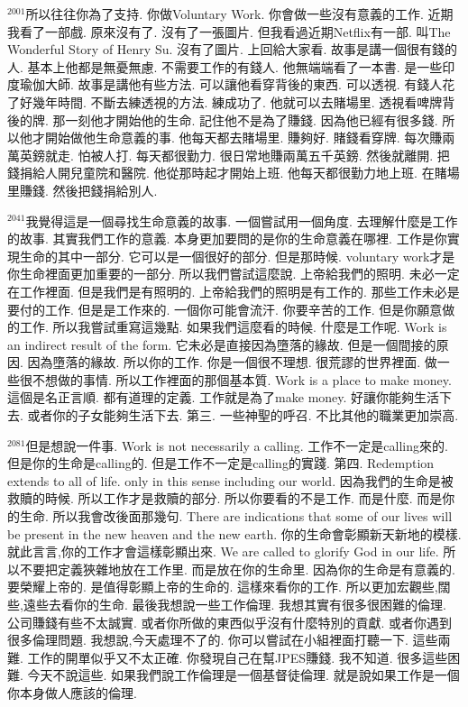 \documentclass{book}
\begin{document}
$^{2001}$所以往往你為了支持.
你做Voluntary Work.
你會做一些沒有意義的工作.
近期我看了一部戲.
原來沒有了.
沒有了一張圖片.
但我看過近期Netflix有一部.
叫The Wonderful Story of Henry Su.
沒有了圖片.
上回給大家看.
故事是講一個很有錢的人.
基本上他都是無憂無慮.
不需要工作的有錢人.
他無端端看了一本書.
是一些印度瑜伽大師.
故事是講他有些方法.
可以讓他看穿背後的東西.
可以透視.
有錢人花了好幾年時間.
不斷去練透視的方法.
練成功了.
他就可以去賭場里.
透視看啤牌背後的牌.
那一刻他才開始他的生命.
記住他不是為了賺錢.
因為他已經有很多錢.
所以他才開始做他生命意義的事.
他每天都去賭場里.
賺夠好.
賭錢看穿牌.
每次賺兩萬英鎊就走.
怕被人打.
每天都很勤力.
很日常地賺兩萬五千英鎊.
然後就離開.
把錢捐給人開兒童院和醫院.
他從那時起才開始上班.
他每天都很勤力地上班.
在賭場里賺錢.
然後把錢捐給別人.

$^{2041}$我覺得這是一個尋找生命意義的故事.
一個嘗試用一個角度.
去理解什麼是工作的故事.
其實我們工作的意義.
本身更加要問的是你的生命意義在哪裡.
工作是你實現生命的其中一部分.
它可以是一個很好的部分.
但是那時候.
voluntary work才是你生命裡面更加重要的一部分.
所以我們嘗試這麼說.
上帝給我們的照明.
未必一定在工作裡面.
但是我們是有照明的.
上帝給我們的照明是有工作的.
那些工作未必是要付的工作.
但是是工作來的.
一個你可能會流汗.
你要辛苦的工作.
但是你願意做的工作.
所以我嘗試重寫這幾點.
如果我們這麼看的時候.
什麼是工作呢.
Work is an indirect result of the form.
它未必是直接因為墮落的緣故.
但是一個間接的原因.
因為墮落的緣故.
所以你的工作.
你是一個很不理想.
很荒謬的世界裡面.
做一些很不想做的事情.
所以工作裡面的那個基本質.
Work is a place to make money.
這個是名正言順.
都有道理的定義.
工作就是為了make money.
好讓你能夠生活下去.
或者你的子女能夠生活下去.
第三.
一些神聖的呼召.
不比其他的職業更加崇高.

$^{2081}$但是想說一件事.
Work is not necessarily a calling.
工作不一定是calling來的.
但是你的生命是calling的.
但是工作不一定是calling的實踐.
第四.
Redemption extends to all of life.
only in this sense including our world.
因為我們的生命是被救贖的時候.
所以工作才是救贖的部分.
所以你要看的不是工作.
而是什麼.
而是你的生命.
所以我會改後面那幾句.
There are indications that some of our lives will be present in the new heaven and the new earth.
你的生命會彰顯新天新地的模樣.
就此言言,你的工作才會這樣彰顯出來.
We are called to glorify God in our life.
所以不要把定義狹雜地放在工作里.
而是放在你的生命里.
因為你的生命是有意義的.
要榮耀上帝的.
是值得彰顯上帝的生命的.
這樣來看你的工作.
所以更加宏觀些,闊些,遠些去看你的生命.
最後我想說一些工作倫理.
我想其實有很多很困難的倫理.
公司賺錢有些不太誠實.
或者你所做的東西似乎沒有什麼特別的貢獻.
或者你遇到很多倫理問題.
我想說,今天處理不了的.
你可以嘗試在小組裡面打聽一下.
這些兩難.
工作的開單似乎又不太正確.
你發現自己在幫JPES賺錢.
我不知道.
很多這些困難.
今天不說這些.
如果我們說工作倫理是一個基督徒倫理.
就是說如果工作是一個你本身做人應該的倫理.
\end{document}
